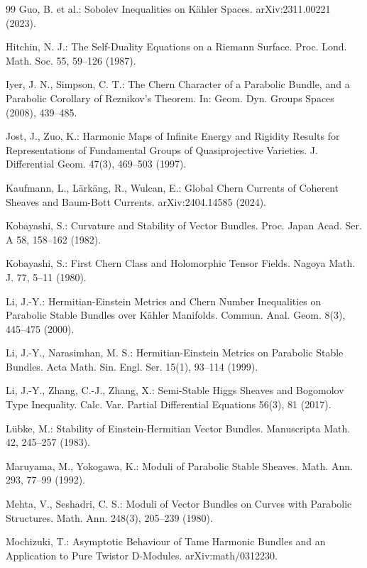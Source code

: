 \documentclass[12pt,a4paper]{article}
\begin{document}
\begin{thebibliography}{99}
Guo, B. et al.: Sobolev Inequalities on K\"ahler Spaces. arXiv:2311.00221 (2023).

Hitchin, N. J.: The Self-Duality Equations on a Riemann Surface. Proc. Lond. Math. Soc. 55, 59--126 (1987).

Iyer, J. N., Simpson, C. T.: The Chern Character of a Parabolic Bundle, and a Parabolic Corollary of Reznikov's Theorem. In: Geom. Dyn. Groups Spaces (2008), 439--485.

Jost, J., Zuo, K.: Harmonic Maps of Infinite Energy and Rigidity Results for Representations of Fundamental Groups of Quasiprojective Varieties. J. Differential Geom. 47(3), 469--503 (1997).

Kaufmann, L., L\"ark\"ang, R., Wulcan, E.: Global Chern Currents of Coherent Sheaves and Baum-Bott Currents. arXiv:2404.14585 (2024).

Kobayashi, S.: Curvature and Stability of Vector Bundles. Proc. Japan Acad. Ser. A 58, 158--162 (1982).

Kobayashi, S.: First Chern Class and Holomorphic Tensor Fields. Nagoya Math. J. 77, 5--11 (1980).

Li, J.-Y.: Hermitian-Einstein Metrics and Chern Number Inequalities on Parabolic Stable Bundles over K\"ahler Manifolds. Commun. Anal. Geom. 8(3), 445--475 (2000).

Li, J.-Y., Narasimhan, M. S.: Hermitian-Einstein Metrics on Parabolic Stable Bundles. Acta Math. Sin. Engl. Ser. 15(1), 93--114 (1999).

Li, J.-Y., Zhang, C.-J., Zhang, X.: Semi-Stable Higgs Sheaves and Bogomolov Type Inequality. Calc. Var. Partial Differential Equations 56(3), 81 (2017).

L\"ubke, M.: Stability of Einstein-Hermitian Vector Bundles. Manuscripta Math. 42, 245--257 (1983).

Maruyama, M., Yokogawa, K.: Moduli of Parabolic Stable Sheaves. Math. Ann. 293, 77--99 (1992).

Mehta, V., Seshadri, C. S.: Moduli of Vector Bundles on Curves with Parabolic Structures. Math. Ann. 248(3), 205--239 (1980).

Mochizuki, T.: Asymptotic Behaviour of Tame Harmonic Bundles and an Application to Pure Twistor D-Modules. arXiv:math/0312230.


\end{thebibliography}
\end{document}
